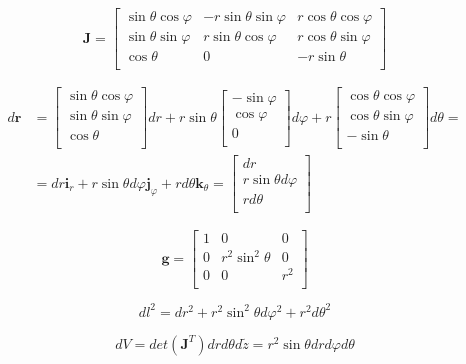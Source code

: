 \documentclass
[
a4paper,                      %
twoside,					  %
12pt,                         %
abstract,		      %
fleqn,                        %
]
{scrartcl} %
\begin{document}
\begin{description}
\begin{equation}
\mathbf{J}=\begin{bmatrix}
\sin{\theta}\cos{\varphi}&-r\sin{\theta}\sin{\varphi}&r\cos{\theta}\cos{\varphi}\\
\sin{\theta}\sin{\varphi}&r\sin{\theta}\cos{\varphi}&r\cos{\theta}\sin{\varphi}\\
\cos{\theta}&0&-r\sin{\theta}\\
\end{bmatrix}
\end{equation}

\begin{equation}
\begin{aligned}
d\mathbf{r}&=\begin{bmatrix}
\sin{\theta}\cos{\varphi}\\
\sin{\theta}\sin{\varphi}\\
\cos{\theta}\\
\end{bmatrix}dr+r\sin{\theta}\begin{bmatrix}
-\sin{\varphi}\\
\cos{\varphi}\\
0\\
\end{bmatrix}d\varphi+r\begin{bmatrix}
\cos{\theta}\cos{\varphi}\\
\cos{\theta}\sin{\varphi}\\
-\sin{\theta}\\
\end{bmatrix}d\theta=\\
&=dr\mathbf{i}_{r}+r\sin{\theta}d\varphi\mathbf{j}_{\varphi}+rd\theta\mathbf{k}_{\theta}=\begin{bmatrix}
dr\\
r\sin{\theta}d\varphi\\
rd\theta\\
\end{bmatrix}
\end{aligned}
\end{equation}

\begin{equation}
\mathbf{g}=
\begin{bmatrix}
1&0&0\\
0&r^{2}\sin^{2}{\theta}&0\\
0&0&r^{2}\\
\end{bmatrix}
\end{equation}

\begin{equation}
dl^{2}=dr^{2}+r^{2}\sin^{2}{\theta}d\varphi^{2}+r^{2}d\theta^{2}
\end{equation}

\begin{equation}
dV=det\left(\mathbf{J}^{T}\right)drd\theta d\tilde{z}=r^{2}\sin{\theta}drd\varphi d\theta
\end{equation}

\end{description}
\end{document}
